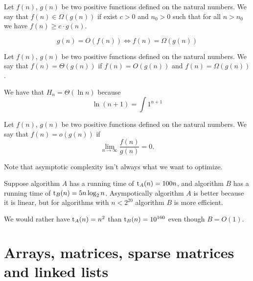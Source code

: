 \documentclass[11pt,a4paper]{article}
\begin{document}
\begin{definition}
    Let $f(n)$, $g(n)$ be two positive functions defined on the natural
    numbers.
    We say that $f(n) \in \Omega(g(n))$ if exist $c > 0$ and $n_0 > 0$ such
    that for all $n > n_0$ we have $f(n) \geq c \cdot g(n)$.
\end{definition}

\begin{remark}
  \[
    g(n) = O(f(n)) \iff
    f(n) = \Omega(g(n))
  \]
\end{remark}

\begin{definition}
    Let $f(n)$, $g(n)$ be two positive functions defined on the natural
    numbers.
    We say that $f(n) = \Theta(g(n))$ if 
    $f(n) = O(g(n))$ and $f(n) = \Omega(g(n))$.
\end{definition}

\begin{example}
  We have that $H_n = \Theta(\ln n)$ because
  \[
    \ln(n + 1) = \int{1}^{n+1}
  \]
\end{example}

\begin{definition}
    Let $f(n)$, $g(n)$ be two positive functions defined on the natural
    numbers.
    We say that $f(n) = o(g(n))$ if 
    \[
      \lim_{n \to \infty} \frac{f(n)}{g(n)} = 0.
    \]
\end{definition}

\begin{example}
\end{example}

Note that asymptotic complexity isn't always what we want to optimize.

\begin{example}
  Suppose algorithm $A$ has a running time of $\mathrm t_A(n) = 100n$, and
  algorithm $B$ has a running time of $\mathrm t_B(n) = 5 n \log_2 n$.
  Asympotically algorithm $A$ is better because it is linear, but
  for algorithms with $n < 2^{20}$ algorithm $B$ is more efficient.
\end{example}
\begin{example}
  We would rather have $\mathrm t_A(n) = n^2$ than $\mathrm t_B(n) = 10^{160}$
  even though $B = O(1)$.
\end{example}


\section{Arrays, matrices, sparse matrices and linked lists}
\end{document}

